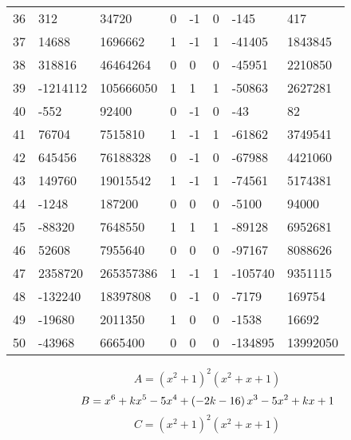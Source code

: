 \documentclass{amsart}
\begin{document}
\begin{longtable}{|l|l|l|lllll|}
36&312&34720&0&-1&0&-145&417\\
37&14688&1696662&1&-1&1&-41405&1843845\\
38&318816&46464264&0&0&0&-45951&2210850\\
39&-1214112&105666050&1&1&1&-50863&2627281\\
40&-552&92400&0&-1&0&-43&82\\
41&76704&7515810&1&-1&1&-61862&3749541\\
42&645456&76188328&0&-1&0&-67988&4421060\\
43&149760&19015542&1&-1&1&-74561&5174381\\
44&-1248&187200&0&0&0&-5100&94000\\
45&-88320&7648550&1&1&1&-89128&6952681\\
46&52608&7955640&0&0&0&-97167&8088626\\
47&2358720&265357386&1&-1&1&-105740&9351115\\
48&-132240&18397808&0&-1&0&-7179&169754\\
49&-19680&2011350&1&0&0&-1538&16692\\
50&-43968&6665400&0&0&0&-134895&13992050\\
\hline
\end{longtable}
$$A=(x^2
 + 1)^{2}(x^2
 + x
 + 1)$$
$$B=x^6
 + k\*x^5
 - 5\*x^4
 + \left(-2\*k
 - 16\right) \*x^3
 - 5\*x^2
 + k\*x
 + 1$$
$$C=(x^2
 + 1)^{2}(x^2
 + x
 + 1)$$
\end{document}
